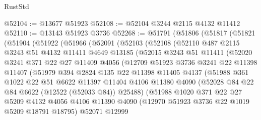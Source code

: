 \begin{lexlean}{RustStd}
\begin{coremodule}
@52104 := @13677 @51923
@52108 := @52104 @3244 @2115 @4132 @11412
@52110 := @13143 @51923 @3736
@52268 := @51791
    (@51806
      (@51817
        (@51821
          (@51904
            (@51922
              (@51966
                (@52091
                  (@52103
                    (@52108
                      (@52110
                        @487
                        @2115
                        @3243
                        @51
                        @4132
                        @11411
                        @4649
                        @13185
                        (@52015
                          @3243
                          @51
                          @11411
                          (@52020
                            @3241
                            @371
                            @22
                            @27
                            @11409
                            @4056
                            (@12709
                              @51923
                              @3736
                              @3241
                              @22
                              @11398
                              @11407
                              (@51979
                                @394
                                @2824
                                @135
                                @22
                                @11398
                                @11405
                                @4137
                                (@51988
                                  @361
                                  @1022
                                  @22
                                  @51
                                  @6622
                                  @11397
                                  @11404
                                  @4106
                                  @11380
                                  @4090
                                  (@52028 @84 @22 @84 @6622 (@12522 (@52033 @84)) @25488)
                                  (@51988
                                    @1020
                                    @371
                                    @22
                                    @27
                                    @5209
                                    @4132
                                    @4056
                                    @4106
                                    @11390
                                    @4090
                                    (@12970 @51923 @3736 @22 @1019 @5209 @18791 @18795)
                                    @52071
                                    @12999

\end{coremodule}
\end{lexlean}
